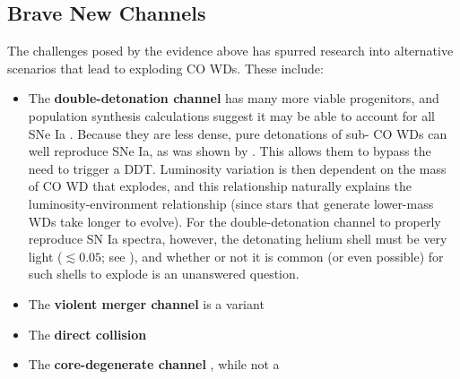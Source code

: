 


\subsection{Brave New Channels}






The challenges posed by the evidence above has spurred research into alternative scenarios that lead to exploding CO WDs.  These include:

\begin{itemize}
	\item The {\bf double-detonation channel} has many more viable progenitors, and population synthesis calculations suggest it may be able to account for all SNe Ia \citep{ruit+11}.  Because they are less dense, pure detonations of sub-{\Mch} CO WDs can well reproduce SNe Ia, as was shown by \cite{sim+10}.  This allows them to bypass the need to trigger a DDT.  Luminosity variation is then dependent on the mass of CO WD that explodes, and this relationship naturally explains the luminosity-environment relationship (since stars that generate lower-mass WDs take longer to evolve).  For the double-detonation channel to properly reproduce SN Ia spectra, however, the detonating helium shell must be very light ($\lesssim 0.05${\Msun}; see \citealt{woosk11}), and whether or not it is common (or even possible) for such shells to explode is an unanswered question.
	\item The {\bf violent merger channel} is a variant
	\item The {\bf direct collision}
	\item The {\bf core-degenerate channel} \citep{}, while not a 
\end{itemize}

